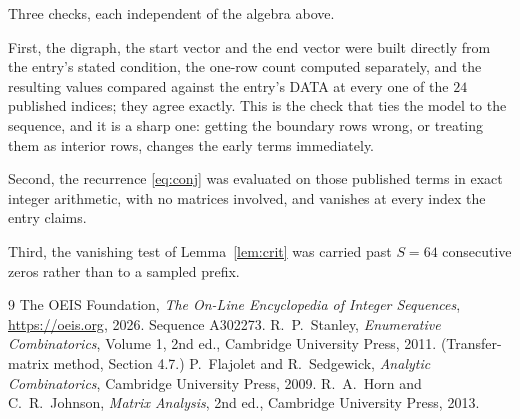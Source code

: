 \documentclass[11pt,a4paper]{article}
\theoremstyle{plain}
\theoremstyle{definition}
\begin{document}
Three checks, each independent of the algebra above.

First, the digraph, the start vector and the end vector were built directly from the
entry's stated condition, the one-row count computed separately, and the resulting values
compared against the entry's DATA at every one of the $24$ published indices; they
agree exactly. This is the check that ties the model to the sequence, and it is a sharp one:
getting the boundary rows wrong, or treating them as interior rows, changes the early terms
immediately.

Second, the recurrence \eqref{eq:conj} was evaluated on those published terms in exact
integer arithmetic, with no matrices involved, and vanishes at every index the entry claims.

Third, the vanishing test of Lemma~\ref{lem:crit} was carried past $S=64$ consecutive
zeros rather than to a sampled prefix.

\begin{thebibliography}{9}
 The OEIS Foundation, \emph{The On-Line Encyclopedia of Integer
Sequences}, \url{https://oeis.org}, 2026. Sequence A302273.
 R.~P.~Stanley, \emph{Enumerative Combinatorics}, Volume 1, 2nd ed.,
Cambridge University Press, 2011. (Transfer-matrix method, Section 4.7.)
 P.~Flajolet and R.~Sedgewick, \emph{Analytic Combinatorics}, Cambridge
University Press, 2009.
 R.~A.~Horn and C.~R.~Johnson, \emph{Matrix Analysis}, 2nd ed., Cambridge
University Press, 2013.
\end{thebibliography}
\end{document}
